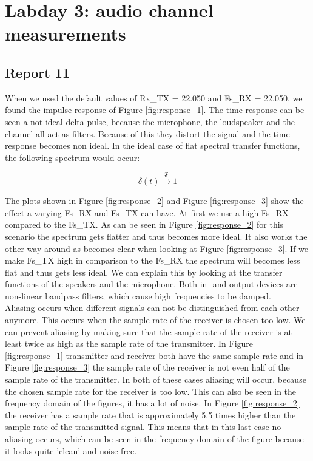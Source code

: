 \documentclass[final]{scrreprt} %
\begin{document}
\chapter{Labday 3: audio channel measurements}
\label{ch:labday3}
\section{Report 11}
When we used the default values of Rx\_TX = 22.050 and Fs\_RX = 22.050, we found the impulse response of Figure \ref{fig:response_1}.
The time response can be seen a not ideal delta pulse, because the microphone, the loudspeaker and the channel all act as filters. 
Because of this they distort the signal and the time response becomes non ideal.
In the ideal case of flat spectral transfer functions, the following spectrum would occur:

\begin{equation}
	\delta(t) \xrightarrow{\mathfrak{F}} 1
\end{equation}

The plots shown in Figure \ref{fig:response_2} and Figure \ref{fig:response_3} show the effect a varying Fs\_RX and Fs\_TX can have.
At first we use a high Fs\_RX compared to the Fs\_TX. 
As can be seen in Figure \ref{fig:response_2} for this scenario the spectrum gets flatter and thus becomes more ideal. 
It also works the other way around as becomes clear when looking at Figure \ref{fig:response_3}. 
If we make Fs\_TX high in comparison to the Fs\_RX the spectrum will becomes less flat and thus gets less ideal.
We can explain this by looking at the transfer functions of the speakers and the microphone. 
Both in- and output devices are non-linear bandpass filters, which cause high frequencies to be damped.\\
\vspace{\parskip}
Aliasing occurs when different signals can not be distinguished from each other anymore.
This occurs when the sample rate of the receiver is chosen too low.
We can prevent aliasing by making sure that the sample rate of the receiver is at least twice as high as the sample rate of the transmitter.
In Figure \ref{fig:response_1} transmitter and receiver both have the same sample rate and in Figure \ref{fig:response_3} the sample rate of the receiver is not even half of the sample rate of the transmitter. 
In both of these cases aliasing will occur, because the chosen sample rate for the receiver is too low. 
This can also be seen in the frequency domain of the figures, it has a lot of noise. 
In Figure \ref{fig:response_2} the receiver has a sample rate that is approximately 5.5 times higher than the sample rate of the transmitted signal.
This means that in this last case no aliasing occurs, which can be seen in the frequency domain of the figure because it looks quite 'clean' and noise free.\\
\end{document}
